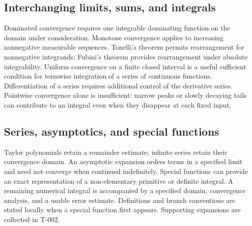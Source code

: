 \documentclass[11pt,oneside,openany]{book}
\begin{document}
\par\addvspace{8pt}\noindent\begin{minipage}{\linewidth}
\subsection{Interchanging limits, sums, and integrals}

Dominated convergence requires one integrable dominating function on the domain
under consideration. Monotone convergence applies to increasing nonnegative
measurable sequences. Tonelli's theorem permits rearrangement for nonnegative
integrands; Fubini's theorem provides rearrangement under absolute integrability.
Uniform convergence on a finite closed interval is a useful sufficient condition
for termwise integration of a series of continuous functions. Differentiation of
a series requires additional control of the derivative series. Pointwise convergence alone is insufficient: narrow peaks or slowly decaying tails
can contribute to an integral even when they disappear at each fixed input.

\end{minipage}\par
\par\addvspace{8pt}\noindent\begin{minipage}{\linewidth}
\subsection{Series, asymptotics, and special functions}

Taylor polynomials retain a remainder estimate; infinite series retain their
convergence domain. An asymptotic expansion orders terms in a specified limit
and need not converge when continued indefinitely. Special functions can provide
an exact representation of a non-elementary primitive or definite integral.
A remaining numerical integral is accompanied by a specified domain, convergence
analysis, and a usable error estimate. Definitions and branch conventions are
stated locally when a special function first appears. Supporting expansions are
collected in T-002.

\end{minipage}\par
\end{document}
